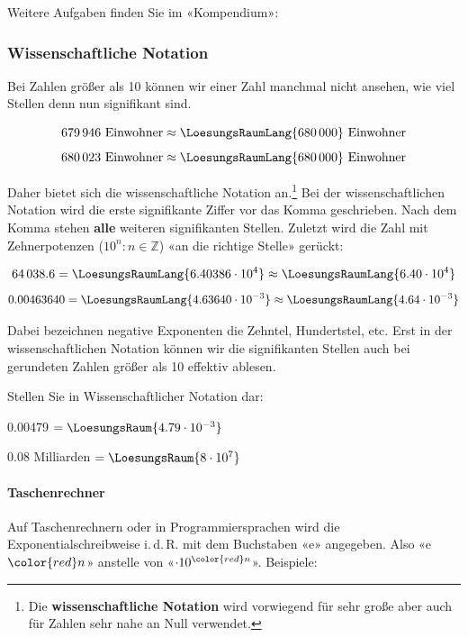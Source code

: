 \newpage

Weitere Aufgaben finden Sie im «Kompendium»:



  
\subsubsection{Wissenschaftliche Notation}\label{wissenschaftlicheNotation}
Bei Zahlen größer als 10 können wir einer Zahl manchmal nicht ansehen, wie viel Stellen denn nun signifikant sind.

$$ 679\,946 \textrm{\ Einwohner} \approx  \LoesungsRaumLang{680\,000} \textrm{\ Einwohner}$$
$$ 680\,023 \textrm{\ Einwohner} \approx  \LoesungsRaumLang{680\,000} \textrm{\ Einwohner}$$

Daher bietet sich die wissenschaftliche Notation an.\footnote{Die
\textbf{wissenschaftliche Notation} wird vorwiegend für sehr große
aber auch für Zahlen sehr nahe an Null verwendet.}
Bei der wissenschaftlichen Notation wird die erste signifikante Ziffer
vor das Komma geschrieben. Nach dem Komma stehen \textbf{alle} weiteren signifikanten Stellen.
Zuletzt wird die Zahl mit Zehnerpotenzen
($10^{n}: n \in \mathbb{Z}$) «an die richtige Stelle» gerückt:

$$64\,038.6  = \LoesungsRaumLang{6.40386 \cdot 10^{ 4}} \approx \LoesungsRaumLang{6.40 \cdot 10^{ 4}}$$
$$0.00463640 = \LoesungsRaumLang{4.63640 \cdot 10^{-3}} \approx \LoesungsRaumLang{4.64 \cdot 10^{-3}}$$

Dabei bezeichnen negative Exponenten die Zehntel, Hundertstel, etc.
Erst in der wissenschaftlichen Notation können wir die signifikanten Stellen auch bei gerundeten Zahlen größer als 10 effektiv ablesen.


Stellen Sie in Wissenschaftlicher Notation dar:

0.00479 $= \LoesungsRaum{4.79 \cdot{}10^{-3}}$

0.08 Milliarden $= \LoesungsRaum{8\cdot{}10^7}$

\newpage

\paragraph{Taschenrechner} Auf Taschenrechnern oder in
Programmiersprachen wird die Exponentialschreibweise i.\,d.\,R. mit dem
Buchstaben «e» angegeben. Also «e$\color{red}n$» anstelle von «$\cdot10^{\color{red}n}$». Beispiele:

